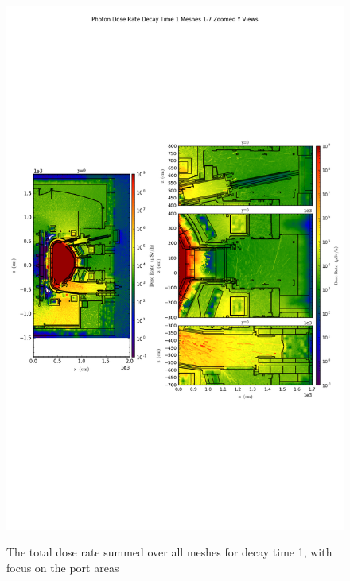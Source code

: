 \documentclass[12pt]{article}
\begin{document}
\begin{figure}[ht!]
\centering
\includegraphics[trim={0cm 9cm 0cm 10cm},clip,scale=0.75]{../plots/final_model_nob4c/Photon_Dose_Rate_Decay_Time_1_Meshes_1-7_Zoomed_Y_Views.png}
\label{fig:photons_dc1_no4bc_total_zoomed}
\caption{The total dose rate summed over all meshes for decay time 1, with focus on the port areas}
\end{figure}
\end{document}
